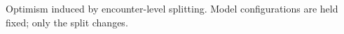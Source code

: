 \begin{table}[t]
\centering
\small
\caption{Optimism induced by encounter-level splitting. Model configurations are held fixed; only the split changes.}\label{tab:split}
\resizebox{\ifdim\width>\textwidth\textwidth\else\width\fi}{!}{}
\\[3pt]
\begin{minipage}{\textwidth}\end{minipage}
\end{table}
